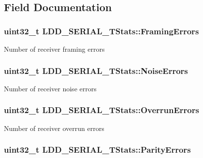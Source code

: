 \subsection{Field Documentation}
\hypertarget{struct_l_d_d___s_e_r_i_a_l___t_stats_a7aa38e2a0215c73f11a5ec2e2db4c39b}{
\subsubsection[{Framing\-Errors}]{\setlength{\rightskip}{0pt plus 5cm}uint32\-\_\-t L\-D\-D\-\_\-\-S\-E\-R\-I\-A\-L\-\_\-\-T\-Stats\-::\-Framing\-Errors}}\label{struct_l_d_d___s_e_r_i_a_l___t_stats_a7aa38e2a0215c73f11a5ec2e2db4c39b}
Number of receiver framing errors \hypertarget{struct_l_d_d___s_e_r_i_a_l___t_stats_a024bac3a1be777c32d07a835f4c42878}{
\subsubsection[{Noise\-Errors}]{\setlength{\rightskip}{0pt plus 5cm}uint32\-\_\-t L\-D\-D\-\_\-\-S\-E\-R\-I\-A\-L\-\_\-\-T\-Stats\-::\-Noise\-Errors}}\label{struct_l_d_d___s_e_r_i_a_l___t_stats_a024bac3a1be777c32d07a835f4c42878}
Number of receiver noise errors \hypertarget{struct_l_d_d___s_e_r_i_a_l___t_stats_aa8a7fee8c6a608b49b8ec1b5a603c536}{
\subsubsection[{Overrun\-Errors}]{\setlength{\rightskip}{0pt plus 5cm}uint32\-\_\-t L\-D\-D\-\_\-\-S\-E\-R\-I\-A\-L\-\_\-\-T\-Stats\-::\-Overrun\-Errors}}\label{struct_l_d_d___s_e_r_i_a_l___t_stats_aa8a7fee8c6a608b49b8ec1b5a603c536}
Number of receiver overrun errors \hypertarget{struct_l_d_d___s_e_r_i_a_l___t_stats_aba7800197922c7effa1eef7f5f5bbd0b}{
\subsubsection[{Parity\-Errors}]{\setlength{\rightskip}{0pt plus 5cm}uint32\-\_\-t L\-D\-D\-\_\-\-S\-E\-R\-I\-A\-L\-\_\-\-T\-Stats\-::\-Parity\-Errors}}\label{struct_l_d_d___s_e_r_i_a_l___t_stats_aba7800197922c7effa1eef7f5f5bbd0b}
